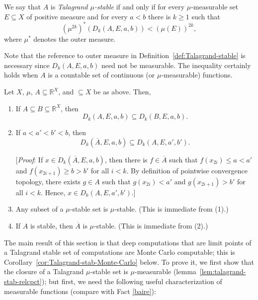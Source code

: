 \begin{definition}\label{def:Talagrand-stable}
    We say that $A$ is \emph{Talagrand $\mu$-stable} if and only if for every $\mu$-measurable set $E\subseteq X$ of positive measure and for every $a<b$ there is $k\geq 1$ such that
    \[
    (\mu^{2k})^*(D_k(A,E,a,b))<(\mu(E))^{2k},
    \]
    where $\mu^*$ denotes the outer measure.
\end{definition}

Note that the reference to outer measure in Definition~\ref{def:Talagrand-stable} is necessary since $D_k(A,E,a,b)$ need not be measurable.
The inequality certainly holds when $A$ is a countable set of continuous (or $\mu$-measurable) functions.

\begin{remark}\label{rem:Talgrand-stability}
    Let $X$, $\mu$, $A\subseteq \mathbb{R}^X$, and $\subseteq X$ be as above. Then,
    \begin{enumerate}
        \item If $A\subseteq B\subseteq \mathbb{R}^X$, then \[D_k(A,E,a,b)\subseteq D_k(B,E,a,b).\]
        \item If $a<a'<b'<b$, then \[D_k(\overline{A},E,a,b)\subseteq D_k(A,E,a',b').\]

[\emph{Proof}: If $x\in D_k(\overline{A},E,a,b)$, then there is $f\in\overline{A}$ such that $f(x_{2i})\leq a<a'$ and $f(x_{2i+1})\geq b>b'$ for all $i<k$.
By definition of pointwise convergence topology, there exists $g\in A$ such that $g(x_{2i})<a'$ and $g(x_{2i+1})>b'$ for all $i<k$.
Hence, $x\in D_k(A,E,a',b')$.]

    \item Any subset of a $\mu$-stable set is $\mu$-stable. (This is immediate from (1).)

    \item If $A$ is stable, then $\overline{A}$ is $\mu$-stable. (This is immediate from (2).)
\end{enumerate}
\end{remark}

The main result of this section is that deep computations that are limit points of a Talagrand stable set of computations are Monte Carlo computable; this is Corollary~\ref{cor:Talagrand-stab-Monte-Carlo} below.
To prove it, we first show that the closure of a Talagrand $\mu$-stable set is $\mu$-measurable (lemma~\ref{lem:talagrand-stab-relcpct});
but first, we need the following useful characterization of measurable functions (compare with Fact \ref{baire}):

